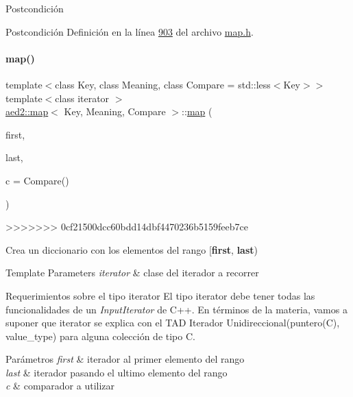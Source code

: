 \begin{DoxyPostcond}{\-Postcondición}
\begin{DoxyPostcond}{\-Postcondición}
Definición en la línea \hyperlink{map_8h_source_l00903}{903} del archivo \hyperlink{map_8h_source}{map.\+h}.

\mbox{\label{classaed2_1_1map_a5d336f3248572beb56be383dcc95cfeb_a5d336f3248572beb56be383dcc95cfeb}} 
\paragraph{\texorpdfstring{map()}{map()}\hspace{0.1cm}{\footnotesize\ttfamily [3/3]}}
{\footnotesize\ttfamily template$<$class Key, class Meaning, class Compare = std\+::less$<$\+Key$>$$>$ \\
template$<$class iterator $>$ \\
\hyperlink{classaed2_1_1map}{aed2\+::map}$<$ Key, Meaning, Compare $>$\+::\hyperlink{classaed2_1_1map}{map} (\begin{DoxyParamCaption}\item[{\hyperlink{classaed2_1_1map_1_1iterator}{iterator}}]{first,  }\item[{\hyperlink{classaed2_1_1map_1_1iterator}{iterator}}]{last,  }\item[{Compare}]{c = {\ttfamily Compare()} }\end{DoxyParamCaption})\hspace{0.3cm}{\ttfamily [inline]}}
>>>>>>> 0cf21500dcc60bdd14dbf4470236b5159feeb7ce



Crea un diccionario con los elementos del rango \mbox{[}{\bfseries first}, {\bfseries last}) 


\begin{DoxyTemplParams}{Template Parameters}
{\em iterator} & clase del iterador a recorrer\\
\hline
\end{DoxyTemplParams}
\begin{DoxyParagraph}{Requerimientos sobre el tipo iterator}
El tipo iterator debe tener todas las funcionalidades de un {\itshape Input\+Iterator} de C++. En términos de la materia, vamos a suponer que iterator se explica con el T\+AD Iterador Unidireccional(puntero(\+C), value\+\_\+type) para alguna colección de tipo C.
\end{DoxyParagraph}

\begin{DoxyParams}{Parámetros}
{\em first} & iterador al primer elemento del rango \\
\hline
{\em last} & iterador pasando el ultimo elemento del rango \\
\hline
{\em c} & comparador a utilizar \\
\hline
\end{DoxyParams}


\end{DoxyPostcond}
\end{DoxyPostcond}
